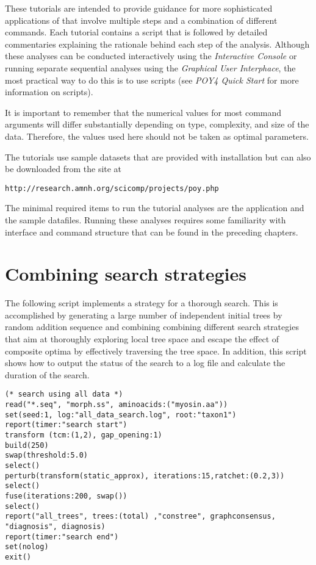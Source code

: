 These tutorials are intended to provide guidance for more sophisticated applications of \poy that involve multiple steps and a combination of different commands. Each tutorial contains a \poy script that is followed by detailed commentaries explaining the rationale behind each step of the analysis. Although these analyses can be conducted interactively using the \emph{Interactive Console} or running separate sequential analyses using the \emph{Graphical User Interphace}, the most practical way to do this is to use \poy scripts (see \emph{ POY4 Quick Start} for more information on \poy scripts).

It is important to remember that the numerical values for most command arguments will differ substantially depending on type, complexity, and size of the data. Therefore, the values used here should not be taken as optimal parameters.

The tutorials use sample datasets that are provided with \poy installation but can also be downloaded from the \poy site at
\begin{center}
\texttt{http://research.amnh.org/scicomp/projects/poy.php}
\end{center}
The minimal required items to run the tutorial analyses are the \poy application and the sample datafiles. Running these analyses requires some familiarity with \poy interface and command structure that can be found in the preceding chapters.

\section{Combining  search strategies}{\label{tutorial1}}
The following script implements a strategy for a thorough search. This is accomplished by generating a large number of independent initial trees by random addition sequence and combining combining different search strategies that aim at thoroughly exploring local tree space and escape the effect of composite optima by effectively traversing the tree space. In addition, this script shows how to output the status of the search to a log file and calculate the duration of the search. 

\begin{verbatim}
(* search using all data *)
read("*.seq", "morph.ss", aminoacids:("myosin.aa"))
set(seed:1, log:"all_data_search.log", root:"taxon1")
report(timer:"search start")
transform (tcm:(1,2), gap_opening:1)
build(250)
swap(threshold:5.0)
select()
perturb(transform(static_approx), iterations:15,ratchet:(0.2,3))
select()
fuse(iterations:200, swap())
select()
report("all_trees", trees:(total) ,"constree", graphconsensus,
"diagnosis", diagnosis)
report(timer:"search end")
set(nolog)
exit()
\end{verbatim}

